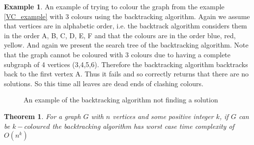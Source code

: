 \documentclass{report}
\theoremstyle{plain}
\newtheorem{theorem}{Theorem}
\theoremstyle{definition}
\newtheorem{example}{Example}
\theoremstyle{remark}
\numberwithin{definition}{chapter}
\numberwithin{example}{chapter}
\numberwithin{figure}{chapter}
\numberwithin{theorem}{chapter}
\numberwithin{lemma}{chapter}
\begin{document}
\begin{example}

An example of trying to colour the graph from the example \ref{VC_example} with 3 colours using the backtracking algorithm. Again we assume that vertices are in alphabetic order, i.e. the backtrack algorithm considers them in the order A, B, C, D, E, F and that the colours are in the order blue, red, yellow. And again we present the search tree of the backtracking algorithm. Note that the graph cannot be coloured with 3 colours due to having a complete subgraph of 4 vertices (3,4,5,6). Therefore the backtracking algorithm backtracks back to the first vertex A. Thus it fails and so correctly returns that there are no solutions. So this time all leaves are dead ends of clashing colours.

\begin{figure}[h]


\center
{}
\caption{An example of the backtracking algorithm not finding a solution}
\end{figure}
\end{example}

\begin{theorem}
For a graph $G$ with $n$ vertices and some positive integer $k$, if $G$ can be $k-coloured$ the backtracking algorithm has worst case time complexity of $O(n^k)$
\end{theorem}
\end{document}
